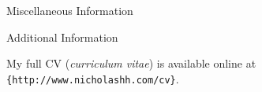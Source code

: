 \documentclass{resume}
\begin{document}
{\begin{rSection}{Miscellaneous Information}
  \end{rSection}





}{

  \begin{rSection}{Additional Information}


    My full CV (\emph{curriculum vitae}) is available online at \texttt{\{http://www.nicholashh.com/cv\}}.

  \end{rSection}

}
\end{document}
